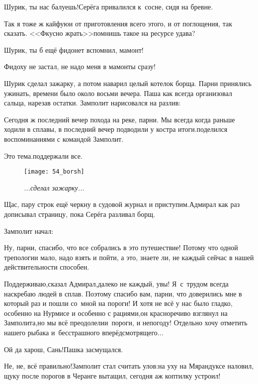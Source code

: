 \diagdash Шурик, ты нас балуешь!\mdash Серёга привалился к~сосне, сидя на бревне.

\diagdash Так я тоже ж кайфую\mdash и от приготовления всего этого, и от поглощения, так сказать. <<Фкусно жрать>>\mdash помнишь такое на ресурсе удава?

\diagdash Шурик, ты б ещё фидонет вспомнил, мамонт!

\diagdash Фидоху не застал, не надо меня в мамонты сразу!

Шурик сделал зажарку, а потом наварил целый котелок борща. Парни принялись ужинать, времени было около восьми вечера. Паша как всегда организовал сальца, нарезав остатки. Замполит нарисовался на разлив:

\diagdash Сегодня ж последний вечер похода на реке, парни. Мы всегда когда раньше ходили в сплавы, в последний вечер подводили у костра итоги.\mdash поделился воспоминаниями с командой Замполит.

\diagdash Это тема.\mdash поддержали все.

\begin{wrapfigure}[18]{l}{0.50\textwidth}
	\centering
	\texttt{[image: 54\_borsh]}
	\caption{\small\textit{...сделал зажарку...}}
\end{wrapfigure}
\mdash Щас, пару строк ещё черкну в судовой журнал и приступим.\mdash Адмирал как раз дописывал страницу, пока Серёга разливал борщ.

Замполит начал:

\diagdash Ну, парни, спасибо, что все собрались в это путешествие! Потому что одной трепологии мало, надо взять и пойти, а это, знаете ли, не каждый сейчас в нашей действительности способен. %

\diagdash Поддерживаю,\mdash сказал Адмирал,\mdash далеко не каждый, увы! Я~с~трудом всегда наскребаю людей в сплав. Поэтому спасибо вам, парни, что доверились мне в который раз и пошли со~мной на пороги! И хотя не всё у нас было гладко, особенно на Нурмисе и особенно с рациями,\mdash он красноречиво взглянул на Замполита,\mdash но мы всё преодолели\mdash и~пороги, и непогоду! Отдельно хочу отметить нашего рыбака и~бесстрашного вперёдсмотрящего$\ldots$

\diagdash Ой да харош, Сань!\mdash Пашка засмущался.

\diagdash Не, не, всё правильно!\mdash Замполит стал считать улов:\mdash на уху на Мярандуксе наловил, щуку после порогов в Черанге вытащил, сегодня аж коптилку устроил!

